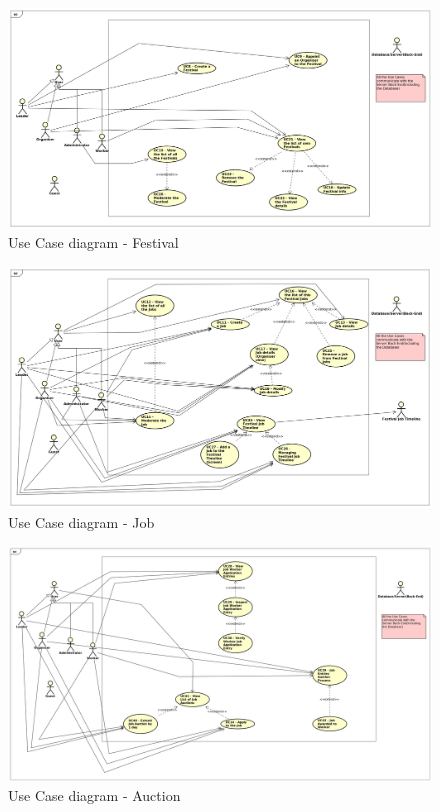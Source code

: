 				\begin{figure}[H]
					\includegraphics[width=\linewidth]{diagrams/uc-diag1-festival.png}
					\caption{Use Case diagram - Festival}
					\label{fig:uc_diag_1_festival}
				\end{figure}
		
				\begin{figure}[H]
					\includegraphics[width=\linewidth]{diagrams/uc-diag2-job.png}
					\caption{Use Case diagram - Job}
					\label{fig:uc_diag_2_job}
				\end{figure}
	
	
				\begin{figure}[H]
					\includegraphics[width=\linewidth]{diagrams/uc-diag3-auction.png}
					\caption{Use Case diagram - Auction}
					\label{fig:uc_diag_3_auction}
				\end{figure}
			
